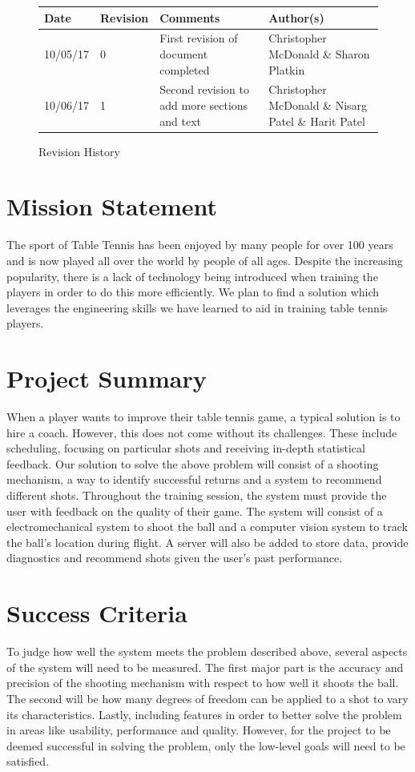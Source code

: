 \documentclass[11pt]{article}
\begin{document}
\tableofcontents
\listoffigures

\vfill
\begin{figure}[htbp]
   \centering
   \noindent\begin{tabularx}{\textwidth}{|X|p{2cm}|X|X|}
   \hline 
   \textbf{Date} & \textbf{Revision} & \textbf{Comments} & \textbf{Author(s)} \\
   \hline 
   10/05/17 & 0 & First revision of document completed & Christopher McDonald \& Sharon Platkin \\ \hline
   10/06/17 & 1 & Second revision to add more sections and text & Christopher McDonald \& Nisarg Patel \& Harit Patel \\
   \hline
   \end{tabularx}
   \caption{Revision History}
\end{figure}

\newpage
\section{Mission Statement}
The sport of Table Tennis has been enjoyed by many people for over 100 years and is now played all over the world by people of all ages. Despite the increasing popularity, there is a lack of technology being introduced when training the players in order to do this more efficiently. We plan to find a solution which leverages the engineering skills we have learned to aid in training table tennis players.
\section{Project Summary}
When a player wants to improve their table tennis game, a typical solution is to hire a coach. However, this does not come without its challenges. These include scheduling, focusing on particular shots and receiving in-depth statistical feedback.
Our solution to solve the above problem will consist of a shooting mechanism, a way to identify successful returns and a system to recommend different shots. Throughout the training session, the system must provide the user with feedback on the quality of their game.
The system will consist of a electromechanical system to shoot the ball and a computer vision system to track the ball's location during flight. A server will also be added to store data, provide diagnostics and recommend shots given the user's past performance.
\section{Success Criteria}
To judge how well the system meets the problem described above, several aspects of the system will need to be measured. The first major part is the accuracy and precision of the shooting mechanism with respect to how well it shoots the ball. The second will be how many degrees of freedom can be applied to a shot to vary its characteristics. Lastly, including features in order to better solve the problem in areas like usability, performance and quality. However, for the project to be deemed successful in solving the problem, only the low-level goals will need to be satisfied. 
\end{document}
